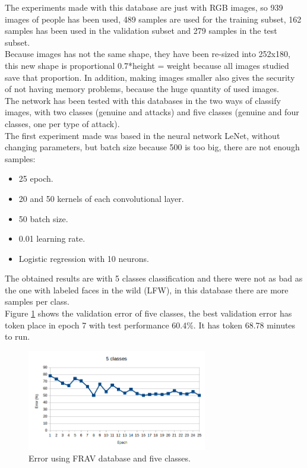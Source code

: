The experiments made with this database are just with RGB images, so 939 images of people has been used, 489 samples are used for the training subset, 162 samples has been used in the validation subset and 279 samples in the test subset.\\

Because images has not the same shape, they have been re-sized into 252x180, this new shape is proportional 0.7*height = weight because all images studied save that proportion. In addition, making images smaller also gives the security of not having memory problems, because the huge quantity of used images.\\

The network has been tested with this databases in the two ways of classify images, with two classes (genuine and attacks) and five classes (genuine and four classes, one per type of attack).\\ %

The first experiment made was based in the neural network LeNet, without changing parameters, but batch size because 500 is too big, there are not enough samples:\\

\begin{itemize}
\item 25 epoch.
\item 20 and 50 kernels of each convolutional layer.
\item 50 batch size.
\item 0.01 learning rate.
\item Logistic regression with 10 neurons.\\
\end{itemize}

The obtained results are with 5 classes classification and there were not as bad as the one with labeled faces in the wild (LFW), in this database there are more samples per class.\\

Figure \ref{fig:FRAV_five} shows the validation error of five classes, the best validation error has token place in epoch 7 with test performance 60.4\%. It has token 68.78 minutes to run.\\

\begin{figure}[htb]
\centering
\includegraphics[width=0.7\textwidth]{images/epoch_5classes_FRAV_1.png}
\caption{Error using FRAV database and five classes.}
\label{fig:FRAV_five}
\end{figure}

